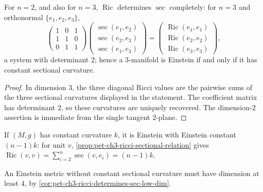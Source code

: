 \begin{corollary}
  \label{cor:pet-ch3-ricci-determines-sec-low-dim}
  \leanok
  For $n=2$, and also for $n=3$, $\operatorname{Ric}$ determines $\sec$
  completely: for $n=3$ and orthonormal $\{e_1,e_2,e_3\}$,
  \[
    \begin{pmatrix}1&0&1\\1&1&0\\0&1&1\end{pmatrix}
    \begin{pmatrix}\sec(e_1,e_2)\\\sec(e_2,e_3)\\\sec(e_1,e_3)\end{pmatrix}
    =\begin{pmatrix}\operatorname{Ric}(e_1,e_1)\\\operatorname{Ric}(e_2,e_2)\\\operatorname{Ric}(e_3,e_3)\end{pmatrix},
  \]
  a system with determinant $2$; hence a $3$-manifold is Einstein if and only
  if it has constant sectional curvature.
\end{corollary}
\begin{proof}
  \leanok
  \sketch
  In dimension $3$, the three diagonal Ricci values are the pairwise sums of
  the three sectional curvatures displayed in the statement. The coefficient
  matrix has determinant $2$, so these curvatures are uniquely recovered. The
  dimension-$2$ assertion is immediate from the single tangent $2$-plane.
\end{proof}

\begin{remark}
  \label{rem:pet-ch3-constant-curvature-einstein}
  \leanok
  \sketch
  If $(M,g)$ has constant curvature $k$, it is Einstein with Einstein constant
  $(n-1)k$: for unit $v$, \cref{prop:pet-ch3-ricci-sectional-relation} gives
  $\operatorname{Ric}(v,v)=\sum_{i=2}^n\sec(v,e_i)=(n-1)k$.
\end{remark}

\begin{remark}
  \label{rem:pet-ch3-einstein-not-constant-curvature-examples}
  \leanok
  \sketch
  An Einstein metric without constant sectional curvature must have dimension
  at least $4$, by
  \cref{cor:pet-ch3-ricci-determines-sec-low-dim}.
\end{remark}

